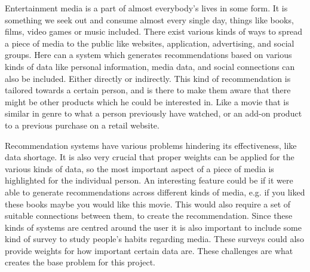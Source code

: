 Entertainment media is a part of almost everybody's lives in some form. It is something we seek out and consume almost every single day, things like books, films, video games or music included. There exist various kinds of ways to spread a piece of media to the public like websites, application, advertising, and social groups. Here can a system which generates recommendations based on various kinds of data like personal information, media data, and social connections can also be included. Either directly or indirectly. This kind of recommendation is tailored towards a certain person, and is there to make them aware that there might be other products which he could be interested in. Like a movie that is similar in genre to what a person previously have watched, or an add-on product to a previous purchase on a retail website.

Recommendation systems have various problems hindering its effectiveness, like data shortage. It is also very crucial that proper weights can be applied for the various kinds of data, so the most important aspect of a piece of media is highlighted for the individual person. An interesting feature could be if it were able to generate recommendations across different kinds of media, e.g. if you liked these books maybe you would like this movie. This would also require a set of suitable connections between them, to create the recommendation. Since these kinds of systems are centred around the user it is also important to include some kind of survey to study people's habits regarding media. These surveys could also provide weights for how important certain data are. These challenges are what creates the base problem for this project.
